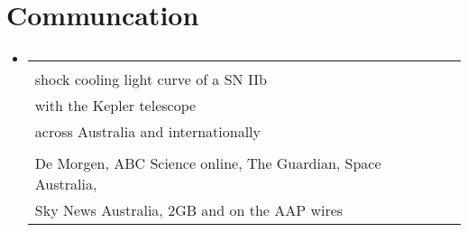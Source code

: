 \documentclass[letterpaper,11pt]{article}
\makeatletter
\newcommand{\resumeItem}[1]{
  \item\small{
    {#1 \vspace{-2pt}}
  }
}
\newcommand{\resumeSubheading}[4]{
  \vspace{-2pt}\item
    \begin{tabular*}{0.97\textwidth}[t]{l@{\extracolsep{\fill}}r}
      \textbf{#1} & #2 \\
      \textit{\small#3} & \textit{\small #4} \\
    \end{tabular*}\vspace{-7pt}
}
\newcommand{\resumeSubHeadingListStart}{\begin{itemize}[leftmargin=0.15in, label={}]}
\newcommand{\resumeSubHeadingListEnd}{\end{itemize}}
\newcommand{\resumeItemListStart}{\begin{itemize}}
\newcommand{\resumeItemListEnd}{\end{itemize}\vspace{-5pt}}
\newcommand{\communicationElement}[5]{%
    \resumeSubHeadingListStart
        \resumeSubheading
            {\makecell[l]{#1}}
            {\makecell[r]{#2}}
            {\makecell[l]{#3}}
            {\makecell[r]{#4}}
            \ifthenelse{\isempty{#5}}{}{%
                \resumeItemListStart
                    \renewcommand*{\do}[1]{\resumeItem{##1}}
                    \docsvlist{#5}%
                \resumeItemListEnd
            }%
    \resumeSubHeadingListEnd
}
\makeatother
\begin{document}
\section{Communcation}

    \communicationElement{SN2017jgh: a high-cadence complete\\shock cooling light curve of a SN IIb\\with the Kepler telescope}{Over 180 items in print, radio, and online,\\across Australia and internationally}{\textbf{Highlights:}, Al Jazeera, National Geographic Indonesia, Radio Canada,\\De Morgen, ABC Science online, The Guardian, Space Australia,\\Sky News Australia, 2GB and on the AAP wires}{2021}{}

\end{document}
